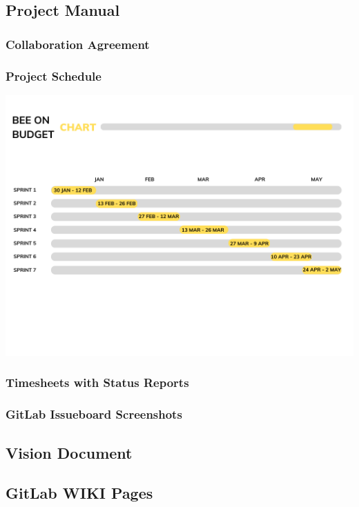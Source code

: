 \subsection{Project Manual}
\subsubsection{Collaboration Agreement}


\subsubsection{Project Schedule}
\includegraphics[scale=0.5]{Project Appendices/Project_schedule_Gantt_chart.png}

\subsubsection{Timesheets with Status Reports}


\subsubsection{GitLab Issueboard Screenshots}


\subsection{Vision Document}


\subsection{GitLab WIKI Pages}



